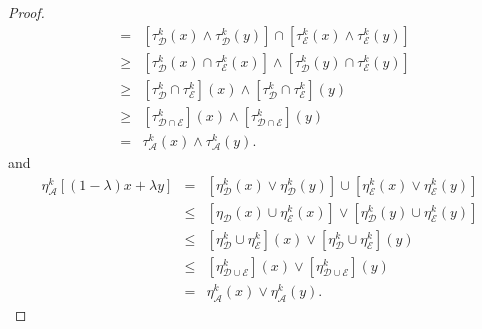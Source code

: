 \documentclass[10pt,a4paper]{amsart}
\begin{document}
\begin{proof}
\begin{eqnarray*}
& = & [\tau^k_{\mathcal{D}} (x) \wedge \tau^k_{\mathcal{D}} (y)] \cap [\tau^k_{\mathcal{E}} (x) \wedge \tau^k_{\mathcal{E}} (y)]\\
&\geq & [\tau^k_{\mathcal{D}}(x) \cap \tau^k_{\mathcal{E}}(x)] \wedge [\tau^k_{\mathcal{D}}(y) \cap \tau^k_{\mathcal{E}}(y)]\\
&\geq &[\tau^k_{\mathcal{D}} \cap \tau^k_{\mathcal{E}}](x) \wedge [\tau^k_{\mathcal{D}} \cap \tau^k_{\mathcal{E}}](y)\\ & \geq & [\tau^k_{\mathcal{D} \cap \mathcal{E}}](x) \wedge [\tau^k_{\mathcal{D}  \cap \mathcal{E}}](y)\\ & = & \tau^k_{\mathcal{A}} (x) \wedge \tau^k_{\mathcal{A}} (y).
\end{eqnarray*}
and 
\begin{eqnarray*} \eta^k_{\mathcal{A}} [(1 - \lambda)x + \lambda y]  
& = & [\eta^k_{\mathcal{D}} (x) \vee \eta^k_{\mathcal{D} } (y)] \cup [\eta^k_{\mathcal{E}} (x) \vee \eta^k_{\mathcal{E}} (y)]\\
&\leq & [\eta_{\mathcal{D}}(x) \cup \eta^k_{\mathcal{E} }(x)] \vee [\eta^k_{\mathcal{D}}(y) \cup \eta^k_{\mathcal{E}}(y)]\\
&\leq &[\eta^k_{\mathcal{D}} \cup \eta^k_{\mathcal{E}}](x) \vee [\eta^k_{\mathcal{D}} \cup \eta^k_{\mathcal{E}}](y)\\ & \leq & [\eta^k_{\mathcal{D} \cup \mathcal{E}}](x) \vee [\eta^k_{\mathcal{D}  \cup \mathcal{E}}](y)\\ & = & \eta^k_{\mathcal{A}} (x) \vee \eta^k_{\mathcal{A}} (y).
\end{eqnarray*}
\end{proof}
\end{document}
